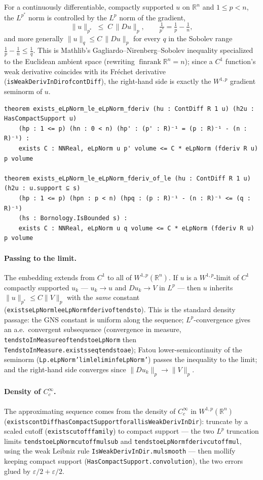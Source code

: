 ﻿\documentclass[12pt, a4paper]{article}
\renewcommand{\_}{\origunderscore\allowbreak}
\theoremstyle{definition}
\theoremstyle{plain}
\begin{document}
For a continuously differentiable, compactly supported $u$ on $\mathbb{R}^n$ and $1\le p<n$, the
$L^{p^*}$ norm is controlled by the $L^p$ norm of the gradient,
\[
  \|u\|_{p^*} \;\le\; C\,\|Du\|_p, \qquad \tfrac{1}{p^*} = \tfrac1p - \tfrac1n ,
\]
and more generally $\|u\|_q \le C\,\|Du\|_p$ for every $q$ in the Sobolev range
$\tfrac1p-\tfrac1n\le\tfrac1q$.  This is Mathlib's Gagliardo--Nirenberg--Sobolev inequality
specialized to the Euclidean ambient space (rewriting $\operatorname{finrank}\mathbb{R}^n = n$);
since a $C^1$ function's weak derivative coincides with its Fréchet derivative
(\texttt{isWeakDerivInDir\_of\_contDiff}), the right-hand side is exactly the $W^{1,p}$ gradient
seminorm of $u$.

\begin{lstlisting}[caption={Sobolev embedding inequality on Rn (proved, zero sorry)}]
theorem exists_eLpNorm_le_eLpNorm_fderiv (hu : ContDiff R 1 u) (h2u : HasCompactSupport u)
    (hp : 1 <= p) (hn : 0 < n) (hp' : (p' : R)⁻¹ = (p : R)⁻¹ - (n : R)⁻¹) :
    exists C : NNReal, eLpNorm u p' volume <= C * eLpNorm (fderiv R u) p volume

theorem exists_eLpNorm_le_eLpNorm_fderiv_of_le (hu : ContDiff R 1 u) (h2u : u.support ⊆ s)
    (hp : 1 <= p) (hpn : p < n) (hpq : (p : R)⁻¹ - (n : R)⁻¹ <= (q : R)⁻¹)
    (hs : Bornology.IsBounded s) :
    exists C : NNReal, eLpNorm u q volume <= C * eLpNorm (fderiv R u) p volume
\end{lstlisting}

\paragraph{Passing to the limit.}  The embedding extends from $C^1$ to all of $W^{1,p}(\mathbb{R}^n)$.
If $u$ is a $W^{1,p}$-limit of $C^1$ compactly supported $u_k$ --- $u_k\to u$ and $Du_k\to V$ in $L^p$
--- then $u$ inherits $\|u\|_{p^*}\le C\|V\|_p$ with the \emph{same} constant
(\texttt{exists\_eLpNorm\_le\_eLpNorm\_fderiv\_of\_tendsto}).  This is the standard density passage: the
GNS constant is uniform along the sequence; $L^p$-convergence gives an a.e.\ convergent subsequence
(convergence in measure, \texttt{tendstoInMeasure\_of\_tendsto\_eLpNorm} then
\texttt{TendstoInMeasure.\allowbreak exists\_seq\_tendsto\_ae}); Fatou lower-semicontinuity of the
seminorm (\texttt{Lp.eLpNorm'\_lim\_le\_liminf\_eLpNorm'}) passes the inequality to the limit; and the
right-hand side converges since $\|Du_k\|_p\to\|V\|_p$.

\paragraph{Density of $C^\infty_c$.}  The approximating sequence comes from the density of $C^\infty_c$
in $W^{1,p}(\mathbb{R}^n)$ (\texttt{exists\_contDiff\_hasCompactSupport\_forall\_isWeakDerivInDir}):
truncate by a scaled cutoff (\texttt{exists\_cutoff\_family}) to compact support --- the two $L^p$
truncation limits \texttt{tendsto\_eLpNorm\_cutoff\_mul\_sub} and
\texttt{tendsto\_eLpNorm\_fderiv\_cutoff\_mul}, using the weak Leibniz rule
\texttt{IsWeakDerivInDir.mul\_smooth} --- then mollify keeping compact support
(\texttt{HasCompactSupport.convolution}), the two errors glued by $\varepsilon/2+\varepsilon/2$.
\end{document}
